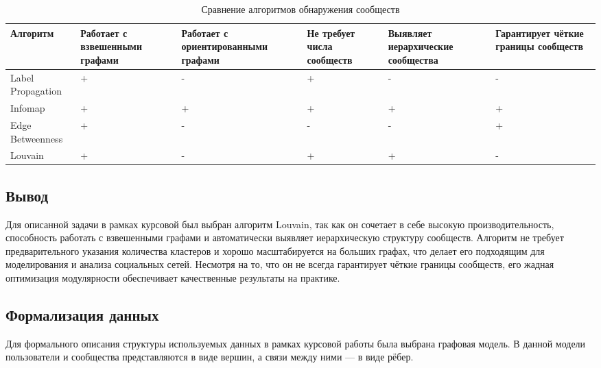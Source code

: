\begin{table}[H]
	\begin{center}
		\begin{threeparttable}
			\caption{Сравнение алгоритмов обнаружения сообществ}
			\label{tbl:srav_transposed}
			\begin{tabularx}{\textwidth}{|X|X|X|X|X|p{2.7cm}|}
				\hline
				\textbf{Алгоритм} & \textbf{Работает с взвешенными графами} & \textbf{Работает с ориентированными графами} & \textbf{Не требует числа сообществ} & \textbf{Выявляет иерархические сообщества} & \textbf{Гарантирует чёткие границы сообществ} \\
				\hline
				Label Propagation & + & - & + & - & - \\
				\hline
				Infomap           & + & + & + & + & + \\
				\hline
				Edge Betweenness  & + & - & - & - & + \\
				\hline
				Louvain           & + & - & + & + & - \\
				\hline
			\end{tabularx}
		\end{threeparttable}
	\end{center}
\end{table}

\subsection{Вывод}

Для описанной задачи в рамках курсовой был выбран алгоритм Louvain, так как он сочетает в себе высокую производительность, способность работать с взвешенными графами и автоматически выявляет иерархическую структуру сообществ. Алгоритм не требует предварительного указания количества кластеров и хорошо масштабируется на больших графах, что делает его подходящим для моделирования и анализа социальных сетей. Несмотря на то, что он не всегда гарантирует чёткие границы сообществ, его жадная оптимизация модулярности обеспечивает качественные результаты на практике.

\subsection{Формализация данных}

Для формального описания структуры используемых данных в рамках курсовой работы была выбрана графовая модель. В данной модели пользователи и сообщества представляются в виде вершин, а связи между ними — в виде рёбер.

